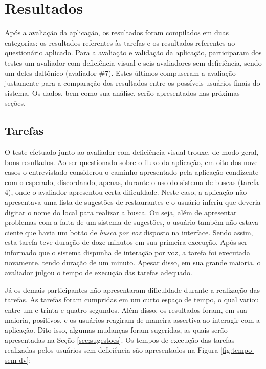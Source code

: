 \chapter{\label{chap:resultados}Resultados}

Após a avaliação da aplicação, os resultados foram compilados em duas categorias: os resultados referentes às tarefas e os resultados referentes ao questionário aplicado. Para a avaliação e validação da aplicação, participaram dos testes um avaliador com deficiência visual e seis avaliadores sem deficiência, sendo um deles daltônico (avaliador \#7). Estes últimos compuseram a avaliação justamente para a comparação dos resultados entre os possíveis usuários finais do sistema. Os dados, bem como sua análise, serão apresentados nas próximas seções.

\section{Tarefas}

O teste efetuado junto ao avaliador com deficiência visual trouxe, de modo geral, bons resultados. Ao ser questionado sobre o fluxo da aplicação, em oito dos nove casos o entrevistado considerou o caminho apresentado pela aplicação condizente com o esperado, discordando, apenas, durante o uso do sistema de buscas (tarefa 4), onde o avaliador apresentou certa dificuldade. Neste caso, a aplicação não apresentava uma lista de sugestões de restaurantes e o usuário inferiu que deveria digitar o nome do local para realizar a busca. Ou seja, além de apresentar problemas com a falta de um sistema de sugestões, o usuário também não estava ciente que havia um botão de \emph{busca por voz} disposto na interface. Sendo assim, esta tarefa teve duração de doze minutos em sua primeira execução. Após ser informado que o sistema dispunha de interação por voz, a tarefa foi executada novamente, tendo duração de um minuto. Apesar disso, em sua grande maioria, o avaliador julgou o tempo de execução das tarefas adequado.

Já os demais participantes não apresentaram dificuldade durante a realização das tarefas. As tarefas foram cumpridas em um curto espaço de tempo, o qual variou entre um e trinta e quatro segundos. Além disso, os resultados foram, em sua maioria, positivos, e os usuários reagiram de maneira assertiva ao interagir com a aplicação. Dito isso, algumas mudanças foram sugeridas, as quais serão apresentadas na Seção \ref{sec:sugestoes}. Os tempos de execução das tarefas realizadas pelos usuários sem deficiência são apresentados na Figura \ref{fig:tempo-sem-dv}:

